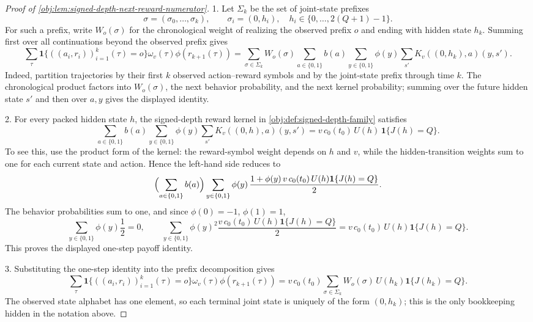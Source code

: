\begin{proof}[Proof of \cref{obj:lem:signed-depth-next-reward-numerator}]
1.  Let \(\Sigma_k\) be the set of joint-state prefixes
\[
\sigma=(\sigma_0,\ldots,\sigma_k),
\qquad
\sigma_i=(0,h_i),\quad h_i\in\{0,\ldots,2(Q+1)-1\}.
\]
For such a prefix, write \(W_o(\sigma)\) for the chronological weight of realizing the observed prefix \(o\) and ending with hidden state \(h_k\).  Summing first over all continuations beyond the observed prefix gives
\[
\sum_{\tau}
\mathbf 1\{((a_i,r_i))_{i=1}^k(\tau)=o\}
\omega_v(\tau)\phi(r_{k+1}(\tau))
=
\sum_{\sigma\in\Sigma_k}
W_o(\sigma)
\sum_{a\in\{0,1\}} b(a)
\sum_{y\in\{0,1\}}\phi(y)
\sum_{s'} K_v((0,h_k),a)(y,s').
\]
Indeed, partition trajectories by their first \(k\) observed action--reward symbols and by the joint-state prefix through time \(k\).  The chronological product factors into \(W_o(\sigma)\), the next behavior probability, and the next kernel probability; summing over the future hidden state \(s'\) and then over \(a,y\) gives the displayed identity. %

2.  For every packed hidden state \(h\), the signed-depth reward kernel in \cref{obj:def:signed-depth-family} satisfies
\[
\sum_{a\in\{0,1\}} b(a)
\sum_{y\in\{0,1\}}\phi(y)
\sum_{s'}K_v((0,h),a)(y,s')
=
v\,c_0(t_0)\,U(h)\,\mathbf 1\{J(h)=Q\}.
\]
To see this, use the product form of the kernel: the reward-symbol weight depends on \(h\) and \(v\), while the hidden-transition weights sum to one for each current state and action.  Hence the left-hand side reduces to
\[
\Bigl(\sum_{a\in\{0,1\}} b(a)\Bigr)
\sum_{y\in\{0,1\}}\phi(y)\,
\frac{1+\phi(y)\,v\,c_0(t_0)\,U(h)\mathbf 1\{J(h)=Q\}}{2}.
\]
The behavior probabilities sum to one, and since \(\phi(0)=-1\), \(\phi(1)=1\),
\[
\sum_{y\in\{0,1\}}\phi(y)\frac{1}{2}=0,
\qquad
\sum_{y\in\{0,1\}}\phi(y)^2\frac{v\,c_0(t_0)\,U(h)\mathbf 1\{J(h)=Q\}}{2}
=
v\,c_0(t_0)\,U(h)\mathbf 1\{J(h)=Q\}.
\]
This proves the displayed one-step payoff identity. %

3.  Substituting the one-step identity into the prefix decomposition gives
\[
\sum_{\tau}
\mathbf 1\{((a_i,r_i))_{i=1}^k(\tau)=o\}
\omega_v(\tau)\phi(r_{k+1}(\tau))
=
v\,c_0(t_0)
\sum_{\sigma\in\Sigma_k}
W_o(\sigma)\,U(h_k)\mathbf 1\{J(h_k)=Q\}.
\]
The observed state alphabet has one element, so each terminal joint state is uniquely of the form \((0,h_k)\); this is the only bookkeeping hidden in the notation above. %


\end{proof}
